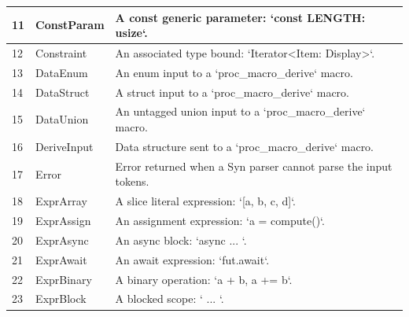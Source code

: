 \begin{longtable}{| p{} | p{} | p{} |}
11    & ConstParam                     & A const generic parameter: `const LENGTH: usize`.                                                              \\ \hline
12    & Constraint                     & An associated type bound: `Iterator<Item: Display>`.                                                           \\ \hline
13    & DataEnum                       & An enum input to a `proc\_macro\_derive` macro.                                                                  \\ \hline
14    & DataStruct                     & A struct input to a `proc\_macro\_derive` macro.                                                                 \\ \hline
15    & DataUnion                      & An untagged union input to a `proc\_macro\_derive` macro.                                                        \\ \hline
16    & DeriveInput                    & Data structure sent to a `proc\_macro\_derive` macro.                                                            \\ \hline
17    & Error                          & Error returned when a Syn parser cannot parse the input tokens.                                                \\ \hline
18    & ExprArray                      & A slice literal expression: `[a, b, c, d]`.                                                                    \\ \hline
19    & ExprAssign                     & An assignment expression: `a = compute()`.                                                                     \\ \hline
20    & ExprAsync                      & An async block: `async { ... }`.                                                                               \\ \hline
21    & ExprAwait                      & An await expression: `fut.await`.                                                                              \\ \hline
22    & ExprBinary                     & A binary operation: `a + b, a += b`.                                                                           \\ \hline
23    & ExprBlock                      & A blocked scope: `{ ... }`.                                                                                    \\ \hline

\end{longtable}
